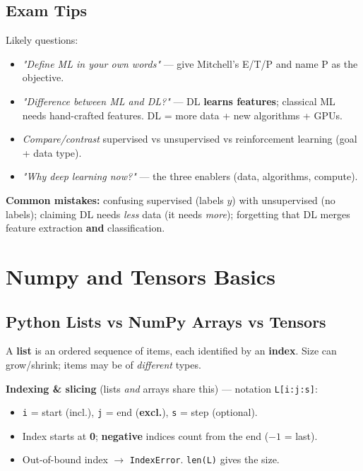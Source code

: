\documentclass[10pt,a4paper]{article}
\begin{document}
	\subsection{Exam Tips}

	\begin{examtipbox}
		Likely questions:
		\begin{itemize}[leftmargin=*]
			\item \emph{"Define ML in your own words"} --- give Mitchell's E/T/P and name P as the objective.
			\item \emph{"Difference between ML and DL?"} --- DL \textbf{learns features}; classical ML needs hand-crafted features. DL = more data + new algorithms + GPUs.
			\item \emph{Compare/contrast} supervised vs unsupervised vs reinforcement learning (goal + data type).
			\item \emph{"Why deep learning now?"} --- the three enablers (data, algorithms, compute).
		\end{itemize}
		\textbf{Common mistakes:} confusing supervised (labels $y$) with unsupervised (no labels); claiming DL needs \emph{less} data (it needs \emph{more}); forgetting that DL merges feature extraction \textbf{and} classification.
	\end{examtipbox}


	\section{Numpy and Tensors Basics}
	
	\subsection{Python Lists vs NumPy Arrays vs Tensors}

	\begin{definitionbox}
		A \textbf{list} is an ordered sequence of items, each identified by an \textbf{index}. Size can grow/shrink; items may be of \emph{different} types.
	\end{definitionbox}

	\textbf{Indexing \& slicing} (lists \emph{and} arrays share this) --- notation \texttt{L[i:j:s]}:
	\begin{itemize}[leftmargin=*]
		\item \texttt{i} = start (incl.), \texttt{j} = end (\textbf{excl.}), \texttt{s} = step (optional).
		\item Index starts at \textbf{0}; \textbf{negative} indices count from the end ($-1$ = last).
		\item Out-of-bound index $\rightarrow$ \texttt{IndexError}. \texttt{len(L)} gives the size.
	\end{itemize}
\end{document}
